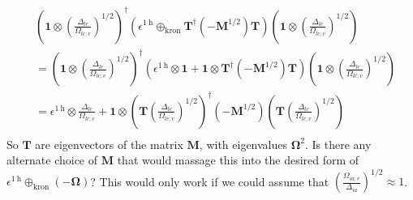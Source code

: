\begin{align}
    &\left( \bm{1} \otimes \left(\frac{\Delta _{lc}}{\Omega _{lc;v}}\right)^{1/2} \right)^\dag \left(\epsilon^{1 \mathrm{~h}} \oplus_{\text{kron}}\bm{T}^\dagger (-\bm{M}^{1/2}) \bm{T}\right)\left( \bm{1} \otimes \left(\frac{\Delta _{lc}}{\Omega _{lc;v}}\right)^{1/2} \right) \\
&= \left( \bm{1} \otimes \left(\frac{\Delta _{lc}}{\Omega _{lc;v}}\right)^{1/2} \right)^\dag \left(\epsilon^{1 \mathrm{~h}} \otimes \bm{1} + \bm{1} \otimes \bm{T}^\dagger (-\bm{M}^{1/2})\bm{T}\right)\left( \bm{1} \otimes \left(\frac{\Delta _{lc}}{\Omega _{lc;v}}\right)^{1/2} \right) \\
&= \epsilon^{1 \mathrm{~h}} \otimes \frac{\Delta _{lc}}{\Omega _{lc;v}} + \bm{1} \otimes \left(\bm{T}\left(\frac{\Delta _{lc}}{\Omega _{lc;v}}\right)^{1/2}\right)^\dagger (-\bm{M}^{1/2})\left(\bm{T}\left(\frac{\Delta _{lc}}{\Omega _{lc;v}}\right)^{1/2}\right) \\
\end{align}
So $\bm{T}$ are eigenvectors of the matrix $\bm{M}$, with eigenvalues $\bm{\Omega }^2$. Is there any alternate choice of $\bm{M}$ that would massage this into the desired form of $\epsilon^{1 \mathrm{~h}} \oplus_{\text{kron}} (-\bm{\Omega })$?
This would only work if we could assume that $\left(\frac{\Omega _{ia;v}}{\Delta _{ia}}\right)^{1/2} \approx 1$. 
